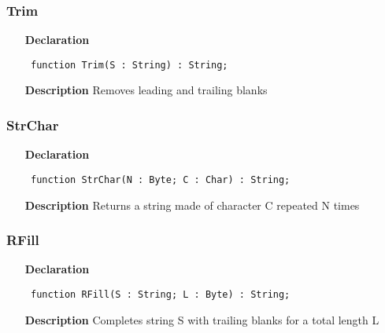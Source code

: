 \documentclass[12pt,a4paper,oneside]{report}
\newcommand{\declarationitem}[1]{\textbf{#1}}
\newcommand{\descriptiontitle}[1]{\textbf{#1}}
\newcommand{\code}[1]{\texttt{#1}}
\begin{document}
\subsubsection{Trim}
\label{ustrings-Trim}
\begin{itemize}\item[\declarationitem{Declaration}\hfill]
	\begin{flushleft}
		\code{
			function Trim(S : String) : String;}
		
	\end{flushleft}
	
	\par
	\item[\descriptiontitle{Description}]
	Removes leading and trailing blanks
	
\end{itemize}
\subsubsection{StrChar}
\label{ustrings-StrChar}
\begin{itemize}\item[\declarationitem{Declaration}\hfill]
	\begin{flushleft}
		\code{
			function StrChar(N : Byte; C : Char) : String;}
		
	\end{flushleft}
	
	\par
	\item[\descriptiontitle{Description}]
	Returns a string made of character C repeated N times
	
\end{itemize}
\subsubsection{RFill}
\label{ustrings-RFill}
\begin{itemize}\item[\declarationitem{Declaration}\hfill]
	\begin{flushleft}
		\code{
			function RFill(S : String; L : Byte) : String;}
		
	\end{flushleft}
	
	\par
	\item[\descriptiontitle{Description}]
	Completes string S with trailing blanks for a total length L
	
\end{itemize}
\end{document}
